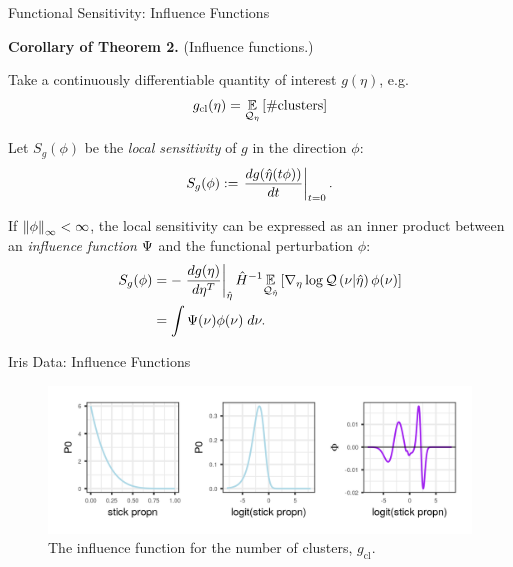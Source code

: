 \begin{frame}{Functional Sensitivity: Influence Functions}

\textbf{Corollary of Theorem 2.} (Influence functions.)

Take a continuously differentiable quantity of
interest $g(\eta)$, e.g.
\begin{align*}
g_{\textrm{cl}}(\eta) = \underset{\mathcal{Q}_{\eta}}{\mathbb{E}}\left[\#\text{clusters}\right]
\end{align*}

\pause 
Let $S_g(\phi)$ be the \textit{local sensitivity} of $g$ in the direction $\phi$:
\begin{align*}
S_g(\phi) := \left.\frac{d g(\hat\eta(t \phi)) }{dt}\right\vert_{t=0}. 
\end{align*}

\pause

If $\left\Vert\phi\right\Vert_{\infty} < \infty$, the local sensitivity can be expressed as
an inner product between
an \textit{influence function} $\Psi$ and the functional perturbation $\phi$:
\begin{align*}
S_g(\phi)   &=
    - \left.\frac{d g(\eta)}{d \eta^T}\right\vert_{\hat\eta}
    \hat{H}^{-1}
    \underset{\mathcal{Q}_{\hat\eta}}{\mathbb{E}}\left[
        {\nabla_\eta \log \mathcal{Q}}\left(\nu \vert \hat\eta\right)
        \phi(\nu)
    \right]
\\&=
\int \Psi(\nu) \phi(\nu) \;d\nu.
\end{align*}

\end{frame}








\begin{frame}{Iris Data: Influence Functions}
  \begin{figure}[!h]
    \centering
    \includegraphics[width = \textwidth]{./figure/iris_infl-1.png}
    \caption*{The influence function for the number of clusters, $g_{\textrm{cl}}$.}
\end{figure}
\end{frame}

